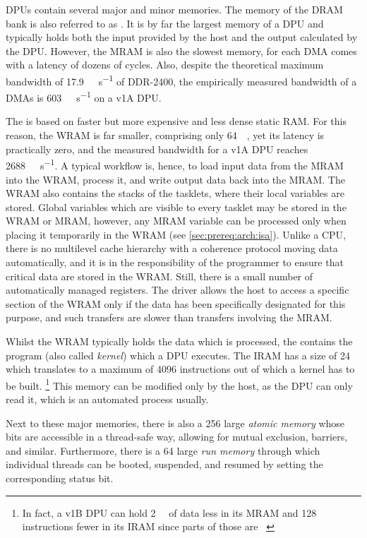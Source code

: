 \Acp{DPU} contain several major and minor memories.
The memory of the \ac{DRAM} bank is also referred to as .
It is by far the largest memory of a \ac{DPU} and typically holds both the input provided by the host and the output calculated by the \ac{DPU}.
However, the \ac{MRAM} is also the slowest memory, for each \ac{DMA} comes with a latency of dozens of cycles.
Also, despite the theoretical maximum bandwidth of \qty{17.9}{\gibi\byte\per\second} of \ac{DDR}-2400, the empirically measured bandwidth of a \acp{DMA} is \qty{603}{\mebi\byte\per\second} on a v1A \ac{DPU}.

The  is based on faster but more expensive and less dense static \ac{RAM}.
For this reason, the \ac{WRAM} is far smaller, comprising only \qty{64}{\kibi\byte}, yet its latency is practically zero, and the measured bandwidth for a v1A \ac{DPU} reaches \qty{2688}{\mebi\byte\per\second}.
A typical workflow is, hence, to load input data from the \ac{MRAM} into the \ac{WRAM}, process it, and write output data back into the \ac{MRAM}.
The \ac{WRAM} also contains the stacks of the tasklets, where their local variables are stored.
Global variables which are visible to every tasklet may be stored in the \ac{WRAM} or \ac{MRAM}, however, any \ac{MRAM} variable can be processed only when placing it temporarily in the \ac{WRAM} (see \cref{sec:prereq:arch:isa}).
Unlike a \ac{CPU}, there is no multilevel cache hierarchy with a coherence protocol moving data automatically, and it is in the responsibility of the programmer to ensure that critical data are stored in the \ac{WRAM}.
Still, there is a small number of automatically managed registers.
The driver allows the host to access a specific section of the \ac{WRAM} only if the data has been specifically designated for this purpose, and such transfers are slower than transfers involving the \ac{MRAM}.

Whilst the \ac{WRAM} typically holds the data which is processed, the  contains the program (also called \emph{kernel}) which a \ac{DPU} executes.
The \ac{IRAM} has a size of \qty{24}{\kibi\byte} which translates to a maximum of \num{4096} instructions out of which a kernel has to be built.%
\footnote{
	In fact, a v1B \ac{DPU} can hold \qty{2}{\kibi\byte} of data less in its \ac{MRAM} and 128 instructions fewer in its \ac{IRAM} since parts of those are ~\cite[Introduction~-- DPU chip characteristics]{upmemSDK}
}
This memory can be modified only by the host, as the \ac{DPU} can only read it, which is an automated process usually.

Next to these major memories, there is also a \qty{256}{\bit} large \emph{atomic memory} whose bits are accessible in a thread-safe way, allowing for mutual exclusion, barriers, and similar.
Furthermore, there is a \qty{64}{\bit} large \emph{run memory} through which individual threads can be booted, suspended, and resumed by setting the corresponding status bit.
